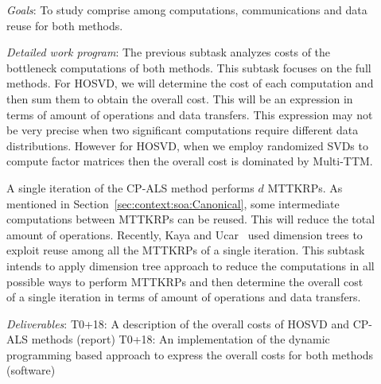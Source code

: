 \documentclass[a4paper,11pt]{article}
\newcommand{\goal}{{\color{orange2}  \emph{Goals}:} }
\newcommand{\dwp}{{\color{orange2}  \emph{Detailed work program}: }}
\newcommand{\deliverables}{{\color{orange2}  \emph{Deliverables}: }}
\begin{document}
	\begin{description}
		\item[] \goal To study comprise among computations, communications and data reuse for both methods. 
		\item[] \dwp The previous subtask analyzes costs of the bottleneck computations of both methods. This subtask focuses on the full methods. For HOSVD, we will determine the cost of each computation and then sum them to obtain the overall cost. This will be an expression in terms of amount of operations and data transfers. This expression may not be very precise when two significant computations require different data distributions. However for HOSVD, when we employ randomized SVDs to compute factor matrices then the overall cost is dominated by Multi-TTM.
		
		A single iteration of the CP-ALS method performs $d$ MTTKRPs. As mentioned in Section~\ref{sec:context:soa:Canonical}, some intermediate computations between MTTKRPs can be reused. This will reduce the total amount of operations. Recently, Kaya and Ucar~\cite{KU-SISC-2018} used dimension trees to exploit reuse among all the MTTKRPs of a single iteration. This subtask intends to apply dimension tree approach to reduce the computations in all possible ways to perform MTTKRPs and then determine the overall cost of a single iteration in terms of amount of operations and data transfers.
		\item[] \deliverables\newline
		T0+18: A description of the overall costs of HOSVD and CP-ALS methods (report)\newline
		T0+18: An implementation of the dynamic programming based approach to express the overall costs for both methods (software)
	\end{description}
	
\end{document}
